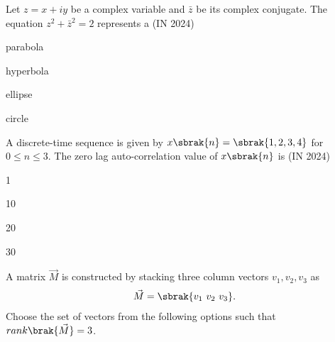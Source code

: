     \item Let $z = x + iy$ be a complex variable and $\bar{z}$ be its complex conjugate. The equation $z^2 + \bar{z}^2 = 2$ represents a
    \hfill{(IN 2024)}
    \begin{enumerate}
        \begin{multicols}{4}
            \item parabola
            \item hyperbola
            \item ellipse
            \item circle
        \end{multicols}
    \end{enumerate}
    \item A discrete-time sequence is given by $x\sbrak{n} = \sbrak{1,2,3,4}$ for $0 \leq n \leq 3$. The zero
    lag auto-correlation value of $x\sbrak{n}$ is
    \hfill{(IN 2024)}
    \begin{enumerate}
        \begin{multicols}{4}
            \item 1
            \item 10
            \item 20
            \item 30
        \end{multicols}
    \end{enumerate}
    \item A matrix $\vec{M}$ is constructed by stacking three column vectors $v_1, v_2, v_3$ as
    \begin{align*}
        \vec{M} = \sbrak{v_1 \ v_2 \ v_3}.
    \end{align*}
    Choose the set of vectors from the following options such that $rank\brak{\vec{M}} = 3$.
    
